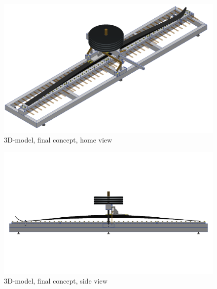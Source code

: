 \begin{figure}
    \centering
    \includegraphics[width=1\textwidth]{figures/finalconcept_home3.png}
    \caption{3D-model, final concept, home view}
    \label{fig:finalconcept_home}
\end{figure}
\begin{figure}
    \centering
    \includegraphics[width=1\textwidth]{figures/finalconcept_side.png}
    \caption{3D-model, final concept, side view}
    \label{fig:finalconcept_side}
\end{figure}




